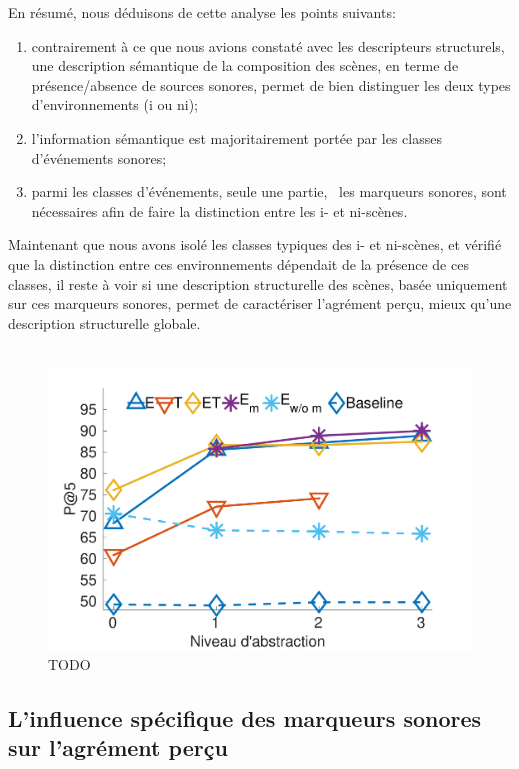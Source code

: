 En résumé, nous déduisons de cette analyse les points suivants:

\begin{enumerate}
\item contrairement à ce que nous avions constaté avec les descripteurs structurels, une description sémantique de la composition des scènes, en terme de présence/absence de sources sonores, permet de bien distinguer les deux types d'environnements (i ou ni);
\item l'information sémantique est majoritairement portée par les classes d'événements sonores;
\item parmi les classes d'événements, seule une partie, \ie~les marqueurs sonores, sont nécessaires afin de faire la distinction entre les i- et ni-scènes.
\end{enumerate}

Maintenant que nous avons isolé les classes typiques des i- et ni-scènes, et vérifié que la distinction entre ces environnements dépendait de la présence de ces classes, il reste à voir si une description structurelle des scènes, basée uniquement sur ces marqueurs sonores, permet de caractériser l'agrément perçu, mieux qu'une description structurelle globale. \\

\\

\begin{figure}[t]
        \myfloatalign
        \includegraphics[width=.8\linewidth]{gfxXpUrbanSoundscape/pa5_1}
       \caption[TODO]{TODO}\label{fig:pa5}
\end{figure}

\subsection{L'influence spécifique des marqueurs sonores sur l'agrément perçu}

